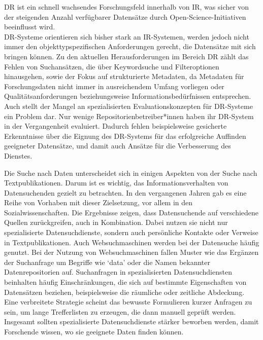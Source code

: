 \documentclass[a4paper,
fontsize=11pt,
oneside,
numbers=noperiodatend,
parskip=half-,
bibliography=totoc,
final
]{scrartcl}
\begin{document}
DR ist ein schnell wachsendes Forschungsfeld innerhalb von IR, was
sicher von der steigenden Anzahl verfügbarer Datensätze durch
Open-Science-Initiativen beeinflusst wird.\\
DR-Systeme orientieren sich bisher stark an IR-Systemen, werden jedoch
nicht immer den objekttypspezifischen Anforderungen gerecht, die
Datensätze mit sich bringen können. Zu den aktuellen Herausforderungen
im Bereich DR zählt das Fehlen von Suchansätzen, die über Keywordsuche
und Filteroptionen hinausgehen, sowie der Fokus auf strukturierte
Metadaten, da Metadaten für Forschungsdaten nicht immer in ausreichendem
Umfang vorliegen oder Qualitätsanforderungen beziehungsweise
Informationsbedürfnissen entsprechen. Auch stellt der Mangel an
spezialisierten Evaluationskonzepten für DR-Systeme ein Problem dar. Nur
wenige Repositorienbetreiber*innen haben ihr DR-System in der
Vergangenheit evaluiert. Dadurch fehlen beispielsweise gesicherte
Erkenntnisse über die Eignung des DR-Systems für das erfolgreiche
Auffinden geeigneter Datensätze, und damit auch Ansätze für die
Verbesserung des Dienstes.

Die Suche nach Daten unterscheidet sich in einigen Aspekten von der
Suche nach Textpublikationen. Darum ist es wichtig, das
Informationsverhalten von Datensuchenden gezielt zu betrachten. In den
vergangenen Jahren gab es eine Reihe von Vorhaben mit dieser
Zielsetzung, vor allem in den Sozialwissenschaften. Die Ergebnisse
zeigen, dass Datensuchende auf verschiedene Quellen zurückgreifen, auch
in Kombination. Dabei nutzen sie nicht nur spezialisierte
Datensuchdienste, sondern auch persönliche Kontakte oder Verweise in
Textpublikationen. Auch Websuchmaschinen werden bei der Datensuche
häufig genutzt. Bei der Nutzung von Websuchmaschinen fallen Muster wie
das Ergänzen der Suchanfrage um Begriffe wie \enquote*{data} oder die
Namen bekannter Datenrepositorien auf. Suchanfragen in spezialisierten
Datensuchdiensten beinhalten häufig Einschränkungen, die sich auf
bestimmte Eigenschaften von Datensätzen beziehen, beispielsweise die
räumliche oder zeitliche Abdeckung. Eine verbreitete Strategie scheint
das bewusste Formulieren kurzer Anfragen zu sein, um lange Trefferlisten
zu erzeugen, die dann manuell geprüft werden. Insgesamt sollten
spezialisierte Datensuchdienste stärker beworben werden, damit
Forschende wissen, wo sie geeignete Daten finden können.
\end{document}

